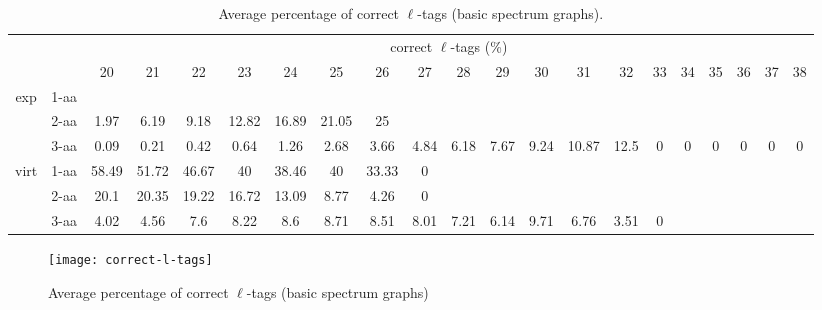 \documentclass{article}[12pt]
\begin{document}
\begin{landscape}
\begin{table}[h]\tiny
\vspace{3mm}
{\centering
\begin{center}
\begin{tabular}{|c|l|c|c|c|c|c|c|c|c|c|c|c|c|c|c|c|c|c|c|c|}
  \hline
  \multicolumn{2}{|c|}{ } & \multicolumn{ 19 }{|c|}{ correct $\ell$-tags (\%)} \\
  \cline{3- 21}
  \multicolumn{2}{|c|}{ }  & 20 & 21 & 22 & 23 & 24 & 25 & 26 & 27 & 28 & 29 & 30 & 31 & 32 & 33 & 34 & 35 & 36 & 37 & 38\\
  \hline
  \multirow{3}{*}{exp}
&  1-aa  &  &  &  &  &  &  &  &  &  &  &  &  &  &  &  &  &  &  & \\
&  2-aa  & 1.97 & 6.19 & 9.18 & 12.82 & 16.89 & 21.05 & 25 &  &  &  &  &  &  &  &  &  &  &  & \\
&  3-aa  & 0.09 & 0.21 & 0.42 & 0.64 & 1.26 & 2.68 & 3.66 & 4.84 & 6.18 & 7.67 & 9.24 & 10.87 & 12.5 & 0 & 0 & 0 & 0 & 0 & 0\\
 \hline
  \multirow{3}{*}{virt} 
&  1-aa  & 58.49 & 51.72 & 46.67 & 40 & 38.46 & 40 & 33.33 & 0 &  &  &  &  &  &  &  &  &  &  & \\
&  2-aa  & 20.1 & 20.35 & 19.22 & 16.72 & 13.09 & 8.77 & 4.26 & 0 &  &  &  &  &  &  &  &  &  &  & \\
&  3-aa  & 4.02 & 4.56 & 7.6 & 8.22 & 8.6 & 8.71 & 8.51 & 8.01 & 7.21 & 6.14 & 9.71 & 6.76 & 3.51 & 0 &  &  &  &  & \\
 \hline
\end{tabular}
\end{center}
\par}
\centering
\caption{ Average percentage of correct $\ell$-tags (basic spectrum graphs).}
\label{table:correct-l-tags}
\vspace{3mm}
\end{table}

\end{landscape}

\begin{figure}
  \begin{center}
\texttt{[image: correct-l-tags]}
\end{center}
\caption{Average percentage of correct $\ell$-tags (basic spectrum graphs)}
  \label{fig:correct-l-tags}
\end{figure}
\end{document}
